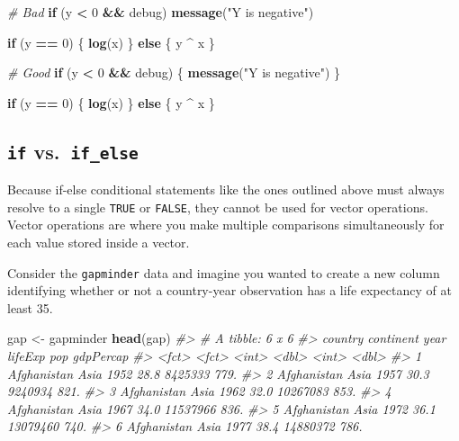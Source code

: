 \documentclass[
]{book}
\newenvironment{Shaded}{\begin{snugshade}}{\end{snugshade}}
\newcommand{\CommentTok}[1]{\textcolor[rgb]{0.56,0.35,0.01}{\textit{#1}}}
\newcommand{\ControlFlowTok}[1]{\textcolor[rgb]{0.13,0.29,0.53}{\textbf{#1}}}
\newcommand{\DecValTok}[1]{\textcolor[rgb]{0.00,0.00,0.81}{#1}}
\newcommand{\KeywordTok}[1]{\textcolor[rgb]{0.13,0.29,0.53}{\textbf{#1}}}
\newcommand{\NormalTok}[1]{#1}
\newcommand{\OperatorTok}[1]{\textcolor[rgb]{0.81,0.36,0.00}{\textbf{#1}}}
\newcommand{\StringTok}[1]{\textcolor[rgb]{0.31,0.60,0.02}{#1}}
\begin{document}
\begin{Shaded}
\begin{Highlighting}[]
\CommentTok{# Bad}
\ControlFlowTok{if}\NormalTok{ (y }\OperatorTok{<}\StringTok{ }\DecValTok{0} \OperatorTok{&&}\StringTok{ }\NormalTok{debug)}
\KeywordTok{message}\NormalTok{(}\StringTok{"Y is negative"}\NormalTok{)}

\ControlFlowTok{if}\NormalTok{ (y }\OperatorTok{==}\StringTok{ }\DecValTok{0}\NormalTok{) \{}
  \KeywordTok{log}\NormalTok{(x)}
\NormalTok{\} }
\ControlFlowTok{else}\NormalTok{ \{}
\NormalTok{  y }\OperatorTok{^}\StringTok{ }\NormalTok{x}
\NormalTok{\}}

\CommentTok{# Good}
\ControlFlowTok{if}\NormalTok{ (y }\OperatorTok{<}\StringTok{ }\DecValTok{0} \OperatorTok{&&}\StringTok{ }\NormalTok{debug) \{}
  \KeywordTok{message}\NormalTok{(}\StringTok{"Y is negative"}\NormalTok{)}
\NormalTok{\}}

\ControlFlowTok{if}\NormalTok{ (y }\OperatorTok{==}\StringTok{ }\DecValTok{0}\NormalTok{) \{}
  \KeywordTok{log}\NormalTok{(x)}
\NormalTok{\} }\ControlFlowTok{else}\NormalTok{ \{}
\NormalTok{  y }\OperatorTok{^}\StringTok{ }\NormalTok{x}
\NormalTok{\}}
\end{Highlighting}
\end{Shaded}

\hypertarget{if-vs.-if_else}{%
\subsection{\texorpdfstring{\texttt{if} vs.~\texttt{if\_else}}{if vs.~if\_else}}\label{if-vs.-if_else}}

Because if-else conditional statements like the ones outlined above must always resolve to a single \texttt{TRUE} or \texttt{FALSE}, they cannot be used for vector operations. Vector operations are where you make multiple comparisons simultaneously for each value stored inside a vector.

Consider the \texttt{gapminder} data and imagine you wanted to create a new column identifying whether or not a country-year observation has a life expectancy of at least 35.

\begin{Shaded}
\begin{Highlighting}[]
\NormalTok{gap <-}\StringTok{ }\NormalTok{gapminder}
\KeywordTok{head}\NormalTok{(gap)}
\CommentTok{#> # A tibble: 6 x 6}
\CommentTok{#>   country     continent  year lifeExp      pop gdpPercap}
\CommentTok{#>   <fct>       <fct>     <int>   <dbl>    <int>     <dbl>}
\CommentTok{#> 1 Afghanistan Asia       1952    28.8  8425333      779.}
\CommentTok{#> 2 Afghanistan Asia       1957    30.3  9240934      821.}
\CommentTok{#> 3 Afghanistan Asia       1962    32.0 10267083      853.}
\CommentTok{#> 4 Afghanistan Asia       1967    34.0 11537966      836.}
\CommentTok{#> 5 Afghanistan Asia       1972    36.1 13079460      740.}
\CommentTok{#> 6 Afghanistan Asia       1977    38.4 14880372      786.}
\end{Highlighting}
\end{Shaded}
\end{document}
